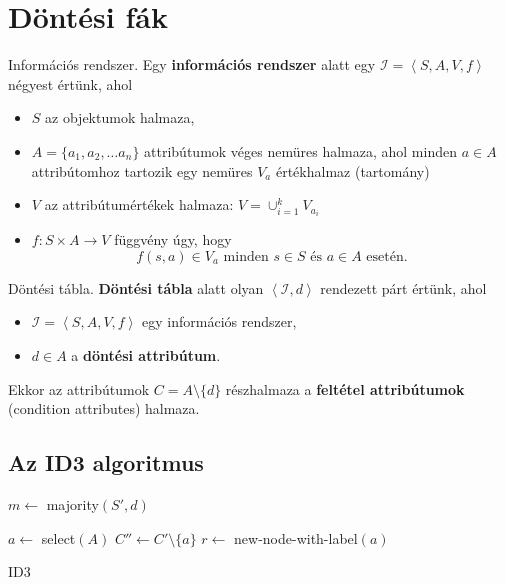 \section{Döntési fák}

\begin{definicio}
    Információs rendszer.
    Egy {\bf információs rendszer} alatt egy $\mathcal{I} = \left<S, A, V, f \right>$
    négyest értünk, ahol
    \begin{itemize}
        \item $S$ az objektumok halmaza,
        \item $A = \{a_1, a_2, \ldots a_n\}$ attribútumok véges nemüres
            halmaza, ahol minden $a \in A$ attribútomhoz tartozik egy nemüres
            $V_a$ értékhalmaz (tartomány)
        \item $V$ az attribútumértékek halmaza: $V = \cup^k_{i=1} V_{a_i}$
        \item $f: S \times A \to V$ függvény úgy, hogy \[
                f(s, a) \in V_a \text{ minden } s \in S \text{ és }
                a \in A \text{ esetén}
        .\]
    \end{itemize}
\end{definicio}

\begin{definicio}
    Döntési tábla.
    {\bf Döntési tábla} alatt olyan $\left<\mathcal{I}, d \right>$
    rendezett párt értünk, ahol
    \begin{itemize}
        \item $\mathcal{I} = \left<S, A, V, f \right>$ egy információs
            rendszer,
        \item $d\in A$ a {\bf döntési attribútum}.
    \end{itemize}

    Ekkor az attribútumok $C = A \setminus \{d\}$ részhalmaza a {\bf feltétel
    attribútumok} (condition attributes) halmaza.
\end{definicio}

\subsection{Az ID3 algoritmus}

\begin{algorithm}[H]
    \DontPrintSemicolon
    {

        $m \gets$ majority$(S', d)$ \;


        $a \gets$ select$(A)$ \;
        $C'' \gets C'\setminus \{a\} $ \;
        $r \gets $ new-node-with-label$(a)$ \;


        \;
    }
    \caption{ID3}
\end{algorithm}
